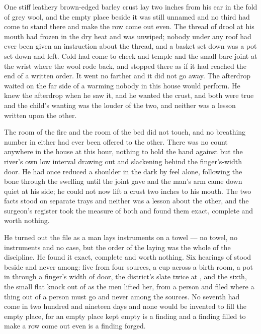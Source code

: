 One stiff leathery brown-edged barley crust lay two inches from his ear in the fold of grey wool, and the empty place beside it was still unnamed and no third had come to stand there and make the row come out even. The thread of drool at his mouth had frozen in the dry heat and was unwiped; nobody under any roof had ever been given an instruction about the thread, and a basket set down was a pot set down and left. Cold had come to cheek and temple and the small bare joint at the wrist where the wool rode back, and stopped there as if it had reached the end of a written order. It went no farther and it did not go away. The afterdrop waited on the far side of a warming nobody in this house would perform. He knew the afterdrop when he saw it, and he wanted the crust, and both were true and the child's wanting was the louder of the two, and neither was a lesson written upon the other.

The room of the fire and the room of the bed did not touch, and no breathing number in either had ever been offered to the other. There was no count anywhere in the house at this hour, nothing to hold the hand against but the river's own low interval drawing out and slackening behind the finger's-width door. He had once reduced a shoulder in the dark by feel alone, following the bone through the swelling until the joint gave and the man's arm came down quiet at his side; he could not now lift a crust two inches to his mouth. The two facts stood on separate trays and neither was a lesson about the other, and the surgeon's register took the measure of both and found them exact, complete and worth nothing.

\scenebreak

He turned out the file as a man lays instruments on a towel --- no towel, no instruments and no case, but the order of the laying was the whole of the discipline. He found it exact, complete and worth nothing. Six hearings of  stood beside and never among: five from four sources, a cup across a birth room, a pot in  through a finger's width of door, the district's slate twice at , and the sixth, the small flat knock out of  as the men lifted her, from a person and filed where a thing out of a person must go and never among the sources. No seventh had come in two hundred and nineteen days and none would be invented to fill the empty place, for an empty place kept empty is a finding and a finding filled to make a row come out even is a finding forged.

